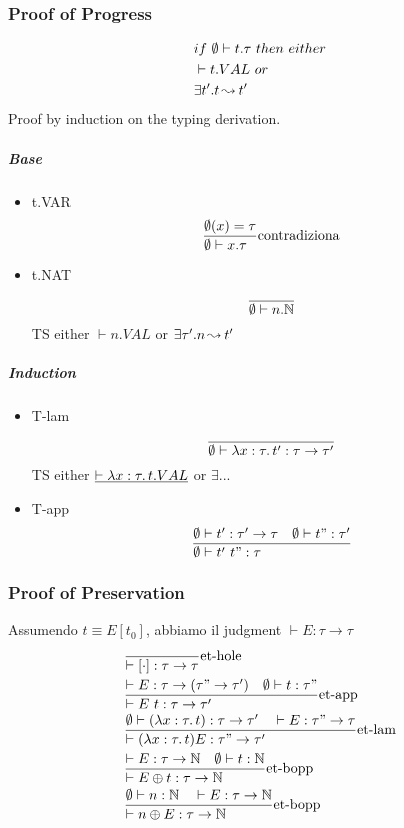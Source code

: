 \documentclass{article}
\newcommand{\bop}[0]{\ensuremath\oplus}
\newcommand{\st}[3][]{\ensuremath \displaystyle\frac{#3\hfill}{#2\hfill} \text{#1}}
\newcommand{\N}{\ensuremath \mathbb N}
\begin{document}
\subsubsection{Proof of Progress}
\begin{align*}
    & if\ \emptyset\vdash t.\tau\ then\ either \\
    & \vdash t.VAL\ or \\
    & \exists t'.t\operatorname{ \leadsto^{} } t'
\end{align*}
Proof by induction on the typing derivation.
\subparagraph{Base} 
\begin{itemize}
    \item t.VAR
        \begin{align*}
            \st[contradiziona]{\emptyset\vdash x.\tau}{\emptyset(x)=\tau}
        \end{align*}
    \item t.NAT
        \begin{align*}
            \st{\emptyset\vdash n.\N}{}
        \end{align*}
        TS either $\vdash n.VAL$ or $\exists \tau'. n\operatorname{ \leadsto^{} } t'$
\end{itemize}

\subparagraph{Induction}
\begin{itemize}
    \item T-lam
        \begin{align*}
            \st{\emptyset\vdash \lam{x:\tau}{t'}:\tau\to\tau'}{}
        \end{align*}
        TS either $\underline{\vdash \lambda x:\tau\ldotp t.VAL}$ or $\exists ...$
    \item T-app
        \begin{align*}
            \st{\emptyset\vdash t'\ t":\tau}{\emptyset\vdash t':\tau'\to\tau \quad \emptyset\vdash t":\tau'}
        \end{align*}
\end{itemize}

\subsubsection{Proof of Preservation}
Assumendo $t\equiv E[t_0]$, abbiamo il judgment $\vdash E:\tau\to\tau$
\begin{align*}
    & \st[et-hole]{\vdash[\cdot]:\tau\to\tau}{} \\
    & \st[et-app]{\vdash E\ t:\tau\to\tau'}{\vdash E:\tau\to(\tau"\to\tau')\quad \emptyset\vdash t:\tau"} \\
    & \st[et-lam]{\vdash (\lam{x:\tau}{t}) E:\tau"\to\tau'}{\emptyset\vdash (\lam{x:\tau}{t}):\tau\to\tau'\quad\vdash E:\tau"\to\tau} \\
    & \st[et-bopp]{\vdash E\bop t:\tau\to\N}{\vdash E:\tau\to\N\quad\emptyset\vdash t:\N} \\
    & \st[et-bopp]{\vdash n\bop E:\tau\to\N}{\emptyset\vdash n:\N\quad\vdash E:\tau\to\N} \\
\end{align*}
\end{document}
